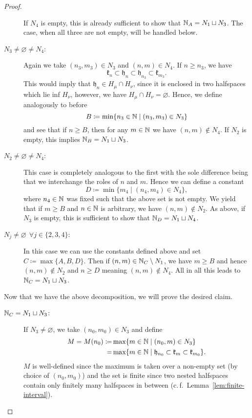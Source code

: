 \begin{proof}
\begin{description}
\[    \]
    If \(N_4\) is empty, this is already sufficient to show that \(\mathbb{N}_A = N_1 \sqcup N_3\). The case, when all three are not empty, will be handled below.
  \item[\(N_3 \neq \varnothing \neq N_4\):] Again we take \((n_3, m_3) \in N_3\) and \((n,m) \in N_4\). If \(n \geq n_3\), we have
    \[
      \mathfrak{k}_n \subset \mathfrak{h}_n \subset \mathfrak{h}_{n_3} \subset \mathfrak{k}_{m_3}.
    \]
    This would imply that \(\mathfrak{h}_n \in H_\mu \cap H_\nu\), since it is enclosed in two halfspaces which lie inf \(H_\nu\), however, we have \(H_\mu \cap H_\nu = \varnothing\). Hence, we define analogously to before
    \[
      B \coloneqq \min \{n_3 \in \mathbb{N} \mid (n_3, m_3) \in N_3\}
    \]
    and see that if \(n \geq B\), then for any \(m \in \mathbb{N}\) we have \((n,m) \notin N_4\). If \(N_2\) is empty, this implies \(\mathbb{N}_B = N_1 \sqcup N_3\).
  \item[\(N_2 \neq \varnothing \neq N_4\):] This case is completely analogous to the first with the sole difference being that we interchange the roles of \(n\) and \(m\). Hence we can define a constant
    \[
      D \coloneqq \min \{m_4 \mid (n_4, m_4) \in N_4\},
    \]
    where \(n_4 \in \mathbb{N}\) was fixed such that the above set is not empty. We yield that if \(m \geq B\) and \(n \in \mathbb{N}\) is arbitrary, we have \((n, m) \notin N_2\). As above, if \(N_3 \) is empty, this is sufficient to show that \(\mathbb{N}_D = N_1 \sqcup N_4\).
  \item[\(N_j \neq \varnothing\ \ \forall j \in\{2,3,4\}\):] In this case we can use the constants defined above and set \(C \coloneqq \max \{A,B,D\}\). Then if \((n,m) \in \mathbb{N}_C \setminus N_1\), we have \(m \geq B\) and hence \((n,m) \notin N_2\) and \(n \geq D\) meaning \((n,m) \notin N_4\). All in all this leads to \(\mathbb{N}_C = N_1 \sqcup N_3\).
  \end{description}
  Now that we have the above decomposition, we will prove the desired claim.
  \begin{description}
  \item[\(\mathbb{N}_C = N_1 \sqcup N_3\):] If \(N_3 \neq \varnothing\), we take \((n_0, m_0) \in N_3\) and define
    \begin{align*}
      M = M(n_0)  \coloneqq & \max \{m \in \mathbb{N} \mid (n_0, m) \in N_3\}\\
                      = & \max \{m \in \mathbb{N} \mid \mathfrak{h}_{n_0} \subset \mathfrak{k}_m \subset \mathfrak{k}_{m_0}\}.
    \end{align*}
    \(M\) is well-defined since the maximum is taken over a non-empty set (by choice of \((n_0, m_0)\)) and the set is finite since two nested halfspaces contain only finitely many halfspaces in between (c.\,f.\ Lemma~\ref{lem:finite-interval}).


\end{description}
\end{proof}
